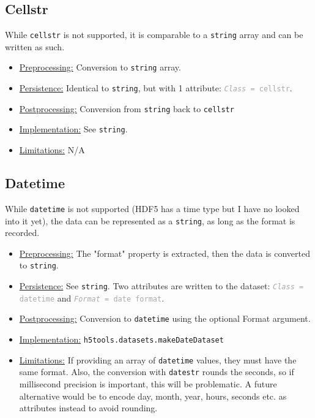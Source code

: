 \documentclass[11pt]{exam}
\newcommand\myfcn[1]{\colorbox{codegray}{\textcolor{codeblue}{\texttt{#1}}}}
\newcommand\matfcn[1]{\textcolor{darkteal}{\texttt{#1}}}
\newcommand\myatt[2]{\textcolor{darkgray}{\texttt{\textit{#1} = #2}}}
\begin{document}
		\subsection{Cellstr}
		\noindent While \texttt{cellstr} is not supported, it is comparable to a \texttt{string} array and can be written as such.  
		\begin{itemize}
			\item \underline{Preprocessing:} Conversion to \texttt{string} array.
			\item \underline{Persistence:} Identical to \texttt{string}, but with 1 attribute: \myatt{Class}{cellstr}.
			\item \underline{Postprocessing:} Conversion from \texttt{string} back to \texttt{cellstr}
			\item \underline{Implementation:} See \texttt{string}.
			\item \underline{Limitations:} N/A
		\end{itemize}

        \subsection{Datetime}
        \noindent While \texttt{datetime} is not supported (HDF5 has a time type but I have no looked into it yet), the data can be represented as a \texttt{string}, as long as the format is recorded. 
        \noindent\begin{itemize}
            \item \underline{Preprocessing:} The "format" property is extracted, then the data is converted to \texttt{string}.
            \item \underline{Persistence:} See \texttt{string}. Two attributes are written to the dataset: \myatt{Class}{datetime} and \myatt{Format}{date format}.
            \item \underline{Postprocessing:} Conversion to \texttt{datetime} using the optional Format argument. 
            \item \underline{Implementation:} \myfcn{h5tools.datasets.makeDateDataset}
            \item \underline{Limitations:} If providing an array of \texttt{datetime} values, they must have the same format. Also, the conversion with \matfcn{datestr} rounds the seconds, so if millisecond precision is important, this will be problematic. A future alternative would be to encode day, month, year, hours, seconds etc. as attributes instead to avoid rounding.  
        \end{itemize}
        
\end{document}
